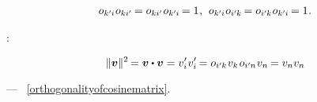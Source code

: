 \nopagebreak\vspace{-0.2em}\begin{gather*}
\cosinematrix{k'\hspace{-0.1ex}i} \hspace{.1ex} \cosinematrix{ki'}
\hspace{-0.2ex}
= \cosinematrix{ki'} \hspace{.1ex} \cosinematrix{k'\hspace{-0.1ex}i} \hspace{-0.2ex}
= 1
\hspace{.1ex} ,
\hspace{.4em}
%
\cosinematrix{k'\hspace{-0.1ex}i} \hspace{.1ex} \cosinematrix{i'\hspace{-0.1ex}k} \hspace{-0.2ex}
= \cosinematrix{i'\hspace{-0.1ex}k} \hspace{.1ex} \cosinematrix{k'\hspace{-0.1ex}i} \hspace{-0.2ex}
= 1
\hspace{.1ex} .
\end{gather*}

:

\nopagebreak\vspace{-0.25em}\begin{equation*}
\|\bm{v}\|^2 \hspace{-0.22ex} = \bm{v} \dotp \bm{v}
= v'_i \hspace{.1ex} v'_i \hspace{-0.2ex}
= \cosinematrix{i'\hspace{-0.1ex}k} \hspace{.1ex} v_k \hspace{.2ex} \cosinematrix{i'\hspace{-0.1ex}n} \hspace{.1ex} v_n \hspace{-0.2ex}
= v_n v_n
\end{equation*}

\nopagebreak\vspace{-0.25em}\noindent
---  \textcolor{magenta}{}~\eqref{orthogonalityofcosinematrix}.

